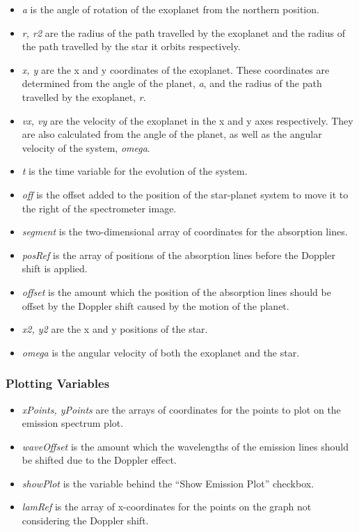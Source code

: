 \begin{itemize}
\item \emph{a} is the angle of rotation of the exoplanet from the northern position.
\item \emph{r, r2} are the radius of the path travelled by the exoplanet and
  the radius of the path travelled by the star it orbits respectively.
\item \emph{x, y} are the x and y coordinates of the exoplanet. These
  coordinates are determined from the angle of the planet, \emph{a}, and
  the radius of the path travelled by the exoplanet, \emph{r}.
\item \emph{vx, vy} are the velocity of the exoplanet in the x and y axes
  respectively. They are also calculated from the angle of the planet,
  as well as the angular velocity of the system, \emph{omega}.
\item \emph{t} is the time variable for the evolution of the system.
\item \emph{off} is the offset added to the position of the star-planet
  system to move it to the right of the spectrometer image.
\item \emph{segment} is the two-dimensional array of coordinates for the absorption lines.
\item \emph{posRef} is the array of positions of the absorption lines before
  the Doppler shift is applied.
\item \emph{offset} is the amount which the position of the absorption lines should be offset by the Doppler shift caused by the motion of the planet.
\item \emph{x2, y2} are the x and y positions of the star.
\item \emph{omega} is the angular velocity of both the exoplanet and the star.
\end{itemize}
\subsubsection*{Plotting Variables}
\label{sec-3-1-1}

\begin{itemize}
\item \emph{xPoints, yPoints} are the arrays of coordinates for the points to plot on the emission spectrum plot.
\item \emph{waveOffset} is the amount which the wavelengths of the emission lines should be shifted due to the Doppler effect.
\item \emph{showPlot} is the variable behind the ``Show Emission Plot'' checkbox.
\item \emph{lamRef} is the array of x-coordinates for the points on the graph not considering the Doppler shift.
\end{itemize}
